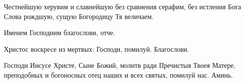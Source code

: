 \begin{mymulticols}
Честнейшую херувим и славнейшую без сравнения серафим, без истления Бога Слова рождшую, сущую Богородицу Тя величаем. 

Именем Господним благослови, отче. 

 \MolitvamiSviatyhOtecNashih 

Христос воскресе из мертвых:  
 Господи, помилуй. 
Благослови.

 Господи Иисусе Христе, Сыне Божий, молитв ради Пречистыя Твоея Матере, преподобных и богоносных отец наших и всех святых, помилуй нас. Аминь. 

\end{mymulticols}

\mychapterending
